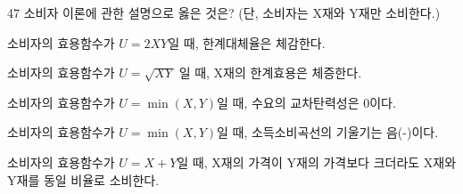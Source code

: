 \begin{question}{47}
소비자 이론에 관한 설명으로 옳은 것은? (단, 소비자는 X재와 Y재만 소비한다.)
\begin{choices}
  \item 소비자의 효용함수가 $U=2XY$일 때, 한계대체율은 체감한다.
  \item 소비자의 효용함수가 $U=\sqrt{XY}$ 일 때, X재의 한계효용은 체증한다.
  \item 소비자의 효용함수가 $U=\min(X,Y)$일 때, 수요의 교차탄력성은 0이다.
  \item 소비자의 효용함수가 $U=\min(X,Y)$일 때, 소득소비곡선의 기울기는 음(-)이다.
  \item 소비자의 효용함수가 $U=X+Y$일 때, X재의 가격이 Y재의 가격보다 크더라도 X재와 Y재를 동일 비율로 소비한다.
\end{choices}
\end{question}
